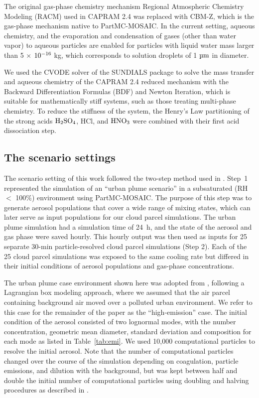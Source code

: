 \documentclass[edeposit,fullpage]{uiucthesis2009}
\begin{document}
The original gas-phase chemistry mechanism Regional Atmospheric
Chemistry Modeling (RACM) used in CAPRAM 2.4 was replaced with CBM-Z,
which is the gas-phase mechanism native to PartMC-MOSAIC. In the
current setting, aqueous chemistry, and the evaporation and
condensation of gases (other than water vapor) to aqueous particles
are enabled for particles with liquid water mass larger than 5
$\times$ $\rm 10^{-16}$ kg, which corresponds to solution droplets of
1 $\rm \mu m$ in diameter.

We used the CVODE \citep{Cohen1996} solver of the SUNDIALS
\citep{Hindmarsh2005} package to solve the mass transfer and aqueous
chemistry of the CAPRAM 2.4 reduced mechanism with the Backward
Differentiation Formulas (BDF) and Newton Iteration, which is suitable
for mathematically stiff systems, such as those treating multi-phase
chemistry.  To reduce the stiffness of the system, the Henry's Law
partitioning of the strong acids $\rm H_2SO_4$, HCl, and $\rm HNO_3$
were combined with their first acid dissociation step.

\subsection{The scenario settings}
The scenario setting of this work followed the two-step method
  used in \citet{ching2012impacts}. Step~1 represented the simulation of an
  ``urban plume scenario'' in a subsaturated (RH $<$ 100\%)
  environment using PartMC-MOSAIC. The purpose of this step was to
  generate aerosol populations that cover a wide range of mixing
  states, which can later serve as input populations for our cloud
  parcel simulations. The urban plume simulation had a simulation time
  of 24~h, and the state of the aerosol and gas phase were saved
  hourly. This hourly output was then used as inputs for 25 separate
  30-min particle-resolved cloud parcel simulations (Step 2). Each of
  the 25 cloud parcel simulations was exposed to the same cooling rate
  but differed in their initial conditions of aerosol populations and
  gas-phase concentrations.

The urban plume case environment shown here was adopted from
\citep{Zaveri2010a}, following a Lagrangian box modeling approach,
where we assumed that the air parcel containing background air moved
over a polluted urban environment. We refer to this case for the
remainder of the paper as the ``high-emission'' case. The initial
condition of the aerosol consisted of two lognormal modes, with the
number concentration, geometric mean diameter, standard deviation and
composition for each mode as listed in Table~\ref{tab:emi}. We used
10,000 computational particles to resolve the initial aerosol. Note
that the number of computational particles changed over the course of
the simulation depending on coagulation, particle emissions, and
dilution with the background, but was kept between half and double the
initial number of computational particles using doubling and halving
procedures as described in \citet{Riemer2009}.
\end{document}
